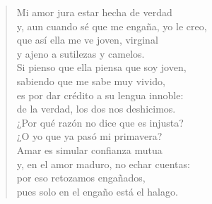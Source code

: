 \documentclass[12pt]{article}
\begin{document}
\clearpage
{}
\begin{verse}

Mi amor jura estar hecha de verdad\\
y, aun cuando sé que me engaña, yo le creo,\\
que así ella me ve joven, virginal\\
y ajeno a sutilezas y camelos.\\
Si pienso que ella piensa que soy joven,\\
sabiendo que me sabe muy vivido,\\
es por dar crédito a su lengua innoble:\\
de la verdad, los dos nos deshicimos.\\
¿Por qué razón no dice que es injusta?\\
¿O yo que ya pasó mi primavera?\\
Amar es simular confianza mutua\\
y, en el amor maduro, no echar cuentas:\\
por eso retozamos engañados,\\
pues solo en el engaño está el halago.
\end{verse}
\end{document}
